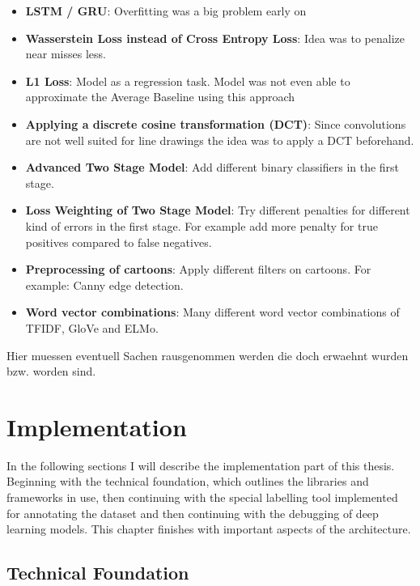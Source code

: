 \documentclass[draft,final,oneside]{vutinfth} %
\begin{document}
\begin{itemize}
\item \textbf{LSTM / GRU}: Overfitting was a big problem early on
\item \textbf{Wasserstein Loss instead of Cross Entropy Loss}: Idea was to penalize near misses less.
\item \textbf{L1 Loss}: Model as a regression task. Model was not even able to approximate the Average Baseline using this approach
\item \textbf{Applying a discrete cosine transformation (DCT)}: Since convolutions are not well suited for line drawings the idea was to apply a DCT beforehand. 
\item \textbf{Advanced Two Stage Model}: Add different binary classifiers in the first stage.
\item \textbf{Loss Weighting of Two Stage Model}: Try different penalties for different kind of errors in the first stage. For example add more penalty for true positives compared to false negatives.
\item \textbf{Preprocessing of cartoons}: Apply different filters on cartoons. For example: Canny edge detection.
\item \textbf{Word vector combinations}: Many different word vector combinations of TFIDF, GloVe and ELMo. 
\end{itemize}

Hier muessen eventuell Sachen rausgenommen werden die doch erwaehnt wurden bzw. worden sind.
\fi

\chapter{Implementation} \label{implementationchapter}

In the following sections I will describe the implementation part of this thesis. Beginning with the technical foundation, which outlines the libraries and frameworks in use, then continuing with the special labelling tool implemented for annotating the dataset and then continuing with the debugging of deep learning models. This chapter finishes with important aspects of the architecture.

\section{Technical Foundation}
\end{document}
